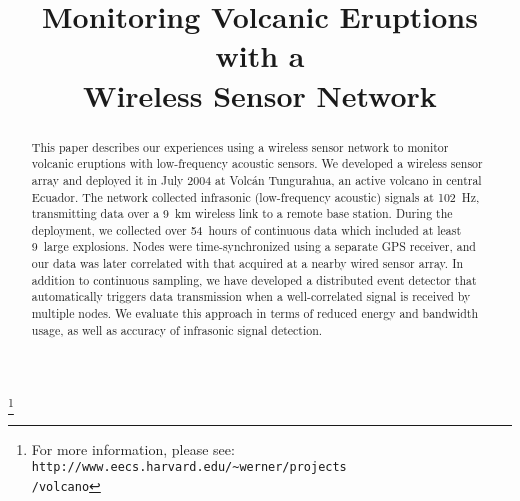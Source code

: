 \documentclass[11pt, conference]{IEEEtran}
\begin{document}
\date{}



\title{ Monitoring Volcanic Eruptions with a \\ Wireless Sensor Network}
\def\footnotemark{}

\author{
}

\thanks{For more information, please see: \\
{\tt http://www.eecs.harvard.edu/\~{}werner/projects\\/volcano}}

\maketitle

\thispagestyle{empty}


\begin{abstract}
This paper describes our experiences using a wireless sensor
network to monitor volcanic eruptions with low-frequency acoustic
sensors. We developed a wireless sensor array and deployed it in July 2004 at
Volc\'{a}n Tungurahua, an active volcano in central Ecuador.
The network collected infrasonic (low-frequency
acoustic) signals at 102~Hz, transmitting data over a 9~km wireless
link to a remote base station. During the deployment, we collected
over 54~hours of continuous data which included at least 9~large
explosions. Nodes were time-synchronized using a separate GPS
receiver, and our data was later correlated with that acquired at a
nearby wired sensor array. In addition to continuous sampling, 
we have developed a distributed event detector that automatically
triggers data transmission when a well-correlated signal is received
by multiple nodes. We evaluate this approach in terms of reduced
energy and bandwidth usage, as well as accuracy of infrasonic
signal detection.
\end{abstract}


 







\def\baselinestretch{0.92}
\begin{footnotesize}
\setlength{\itemsep}{2in}
 
\end{footnotesize}
\end{document}
